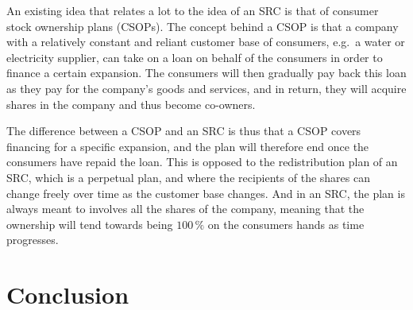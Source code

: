 \documentclass{article}
\begin{document}


An existing idea that relates a lot to the idea of an SRC is that of consumer stock ownership plans (CSOPs). 
The concept behind a CSOP is that a company with a relatively constant and reliant customer base of consumers, e.g.\ a water or electricity supplier, can take on a loan on behalf of the consumers in order to finance a certain expansion. The consumers will then gradually pay back this loan as they pay for the company's goods and services, and in return, they will acquire shares in the company and thus become co-owners. 

The difference between a CSOP and an SRC is thus that a CSOP covers financing for a specific expansion, and the plan will therefore end once the consumers have repaid the loan. This is opposed to the redistribution plan of an SRC, which is a perpetual plan, and where the recipients of the shares can change freely over time as the customer base changes. And in an SRC, the plan is always meant to involves all the shares of the company, meaning that the ownership will tend towards being $100\,\%$ on the consumers hands as time progresses. 



\section{Conclusion}
\end{document}
